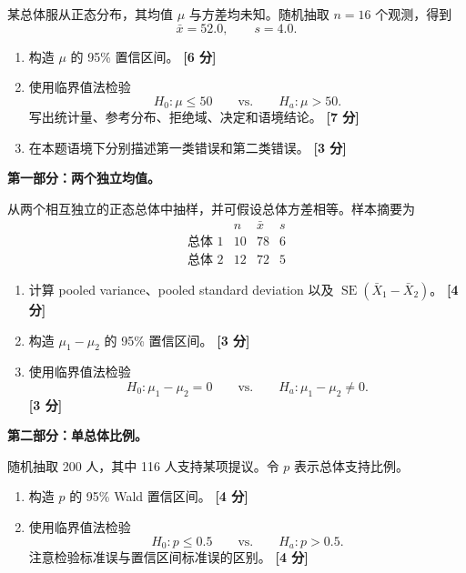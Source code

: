 \documentclass[11pt,a4paper]{article}
\newcommand{\SE}{\operatorname{SE}}
\newcommand{\pts}[1]{\hfill\textbf{[#1 分]}}
\begin{document}
\begin{questionbox}
某总体服从正态分布，其均值 $\mu$ 与方差均未知。随机抽取 $n=16$ 个观测，得到
\[
  \bar x=52.0,
  \qquad
  s=4.0.
\]

\begin{enumerate}
  \item 构造 $\mu$ 的 95\% 置信区间。 \pts{6}
  \item 使用临界值法检验
  \[
    H_0:\mu\leq50
    \qquad\text{vs.}\qquad
    H_a:\mu>50.
  \]
  写出统计量、参考分布、拒绝域、决定和语境结论。 \pts{7}
  \item 在本题语境下分别描述第一类错误和第二类错误。 \pts{3}
\end{enumerate}
\end{questionbox}

\begin{questionbox}[第 3 题：两总体均值与总体比例（18 分）]
\textbf{第一部分：两个独立均值。}

从两个相互独立的正态总体中抽样，并可假设总体方差相等。样本摘要为
\[
\begin{array}{c|ccc}
 & n & \bar x & s\\
\hline
\text{总体 1} & 10 & 78 & 6\\
\text{总体 2} & 12 & 72 & 5
\end{array}
\]

\begin{enumerate}
  \item 计算 pooled variance、pooled standard deviation 以及
  $\SE(\bar X_1-\bar X_2)$。 \pts{4}
  \item 构造 $\mu_1-\mu_2$ 的 95\% 置信区间。 \pts{3}
  \item 使用临界值法检验
  \[
    H_0:\mu_1-\mu_2=0
    \qquad\text{vs.}\qquad
    H_a:\mu_1-\mu_2\ne0.
  \]
  \pts{3}
\end{enumerate}

\textbf{第二部分：单总体比例。}

随机抽取 200 人，其中 116 人支持某项提议。令 $p$ 表示总体支持比例。
\begin{enumerate}[resume]
  \item 构造 $p$ 的 95\% Wald 置信区间。 \pts{4}
  \item 使用临界值法检验
  \[
    H_0:p\leq0.5
    \qquad\text{vs.}\qquad
    H_a:p>0.5.
  \]
  注意检验标准误与置信区间标准误的区别。 \pts{4}
\end{enumerate}
\end{questionbox}
\end{document}
